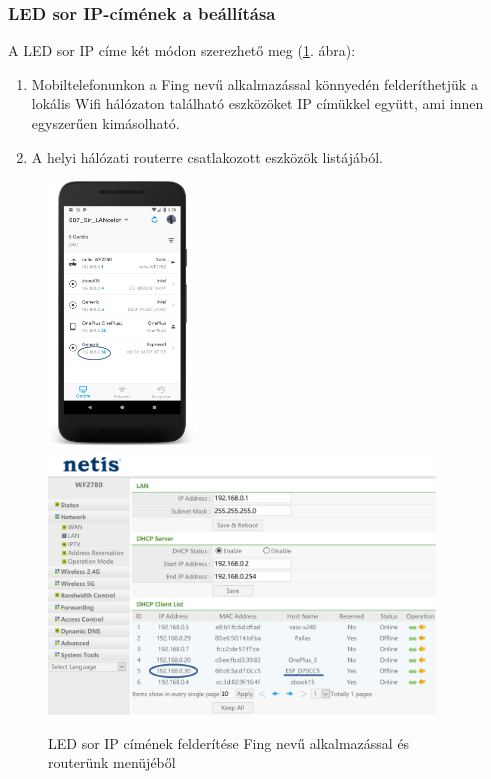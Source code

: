 \documentclass[../main.tex]{subfiles}
\begin{document}
        \subsubsection{LED sor IP-címének a beállítása}
            A LED sor %
            IP címe két módon szerezhető meg (\ref{fig:ip_addres}. ábra):
            
            \begin{enumerate}
                \item Mobiltelefonunkon a Fing nevű alkalmazással könnyedén felderíthetjük a lokális Wifi hálózaton található eszközöket IP címükkel együtt, ami innen egyszerűen kimásolható.
                \item A helyi hálózati routerre csatlakozott eszközök listájából.
            \end{enumerate}
            
            \begin{figure}[h!]
                \includegraphics[height=7cm]{android_res/screen_pictures/ip_addr_fing}
                \includegraphics[height=7cm]{android_res/screen_pictures/ip_addr_router}
                \caption{LED sor IP címének felderítése Fing nevű alkalmazással és routerünk menüjéből}
                \label{fig:ip_addres}
            \end{figure}
\end{document}
